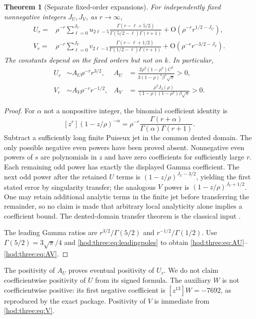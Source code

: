 \documentclass[11pt,letterpaper]{article}
\newtheorem{theorem}{Theorem}[section]
\theoremstyle{definition}\newtheorem{definition}[theorem]{Definition}
\theoremstyle{remark}\newtheorem{remark}[theorem]{Remark}
\newcommand{\OO}{\mathrm O}
\begin{document}
\begin{theorem}[Separate fixed-order expansions]\label{hod:three:thm:orders}
For independently fixed nonnegative integers $J_U,J_V$, as $r\to\infty$,
\begin{align}
U_r={}&\rho^{-r}\sum_{\ell=0}^{J_U}u_{2\ell-5}
\frac{\Gamma(r-\ell+5/2)}{\Gamma(5/2-\ell)\Gamma(r+1)}
+\OO(\rho^{-r}r^{1/2-J_U}),\label{hod:three:eq:Ugamma}\\
V_r={}&\rho^{-r}\sum_{\ell=0}^{J_V}v_{2\ell-1}
\frac{\Gamma(r-\ell+1/2)}{\Gamma(1/2-\ell)\Gamma(r+1)}
+\OO(\rho^{-r}r^{-3/2-J_V}).\label{hod:three:eq:Vgamma}
\end{align}
The constants depend on the fixed orders but not on $k$. In particular,
\begin{align}
U_r&\sim A_U\rho^{-r}r^{3/2},&
A_U&=\frac{2\rho^2(1-\rho^3)C^3}{3(1-\rho)^3\beta^5\sqrt\pi}>0,\label{hod:three:eq:AU}\\
V_r&\sim A_V\rho^{-r}r^{-1/2},&
A_V&=\frac{\rho^3J_3(\rho)}{(1-\rho)(1-\rho^2)\beta\sqrt\pi}>0.\label{hod:three:eq:AV}
\end{align}
\end{theorem}
\begin{proof}
For $\alpha$ not a nonpositive integer, the binomial coefficient identity is
\[
[z^r](1-z/\rho)^{-\alpha}
=\rho^{-r}\frac{\Gamma(r+\alpha)}{\Gamma(\alpha)\Gamma(r+1)}.
\]
Subtract a sufficiently long finite Puiseux jet in the common dented domain. The only possible negative even powers have been proved absent. Nonnegative even powers of $s$ are polynomials in $z$ and have zero coefficients for sufficiently large $r$. Each remaining odd power has exactly the displayed Gamma coefficient. The next odd power after the retained $U$ terms is $(1-z/\rho)^{J_U-3/2}$, yielding the first stated error by singularity transfer; the analogous $V$ power is $(1-z/\rho)^{J_V+1/2}$. One may retain additional analytic terms in the finite jet before transferring the remainder, so no claim is made that arbitrary local analyticity alone implies a coefficient bound. The dented-domain transfer theorem is the classical input \cite{fs,genitrini}.

The leading Gamma ratios are $r^{3/2}/\Gamma(5/2)$ and $r^{-1/2}/\Gamma(1/2)$. Use $\Gamma(5/2)=3\sqrt\pi/4$ and \eqref{hod:three:eq:leadingpoles} to obtain \eqref{hod:three:eq:AU}--\eqref{hod:three:eq:AV}.
\end{proof}
The positivity of $A_U$ proves eventual positivity of $U_r$. We do not claim coefficientwise positivity of $U$ from its signed formula. The auxiliary $W$ is not coefficientwise positive: its first negative coefficient is $[z^{13}]W=-7692$, as reproduced by the exact package. Positivity of $V$ is immediate from \eqref{hod:three:eq:V}.
\end{document}
